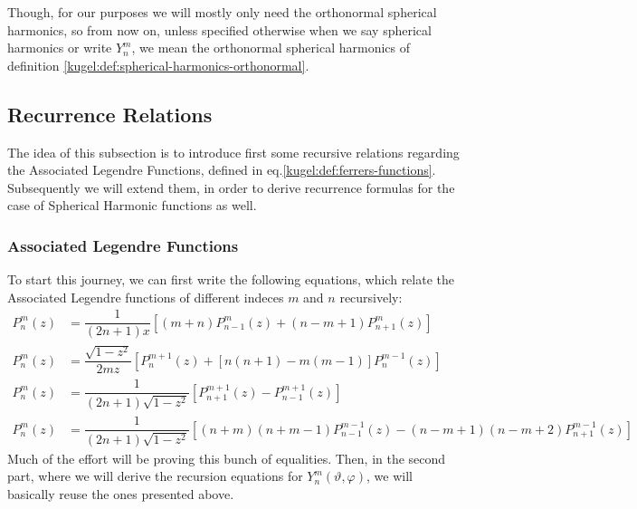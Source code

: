 Though, for our purposes we will mostly only need the orthonormal spherical
harmonics, so from now on, unless specified otherwise when we say spherical
harmonics or write $Y^m_n$, we mean the orthonormal spherical harmonics of
definition \ref{kugel:def:spherical-harmonics-orthonormal}.

\subsection{Recurrence Relations}
The idea of this subsection is to introduce first some recursive relations regarding the Associated Legendre Functions, defined in eq.\eqref{kugel:def:ferrers-functions}. Subsequently we will extend them, in order to derive recurrence formulas for the case of Spherical Harmonic functions as well. 
\subsubsection{Associated Legendre Functions}
To start this journey, we can first write the following equations, which relate the Associated Legendre functions of different indeces $m$ and $n$ recursively:
\begin{subequations}
  \begin{align}
  P^m_n(z) &= \dfrac{1}{(2n+1)x} \left[ (m+n) P^m_{n-1}(z) + (n-m+1) P^m_{n+1}(z) \right] \label{kugel:eq:rec-leg-1} \\
  P^m_n(z) &= \dfrac{\sqrt{1-z^2}}{2mz} \left[ P^{m+1}_n(z) + [n(n+1)-m(m-1)] P^{m-1}_n(z) \right] \label{kugel:eq:rec-leg-2} \\ 
  P^m_n(z) &= \dfrac{1}{(2n+1)\sqrt{1-z^2}} \left[ P^{m+1}_{n+1}(z) - P^{m+1}_{n-1}(z) \right]  \label{kugel:eq:rec-leg-3} \\
  P^m_n(z) &= \dfrac{1}{(2n+1)\sqrt{1-z^2}} \left[ (n+m)(n+m-1)P^{m-1}_{n-1}(z) - (n-m+1)(n-m+2)P^{m-1}_{n+1}(z) \right]  \label{kugel:eq:rec-leg-4}
  \end{align}
\end{subequations}
Much of the effort will be proving this bunch of equalities. Then, in the second part, where we will derive the recursion equations for $Y^m_n(\vartheta,\varphi)$, we will basically reuse the ones presented above.

